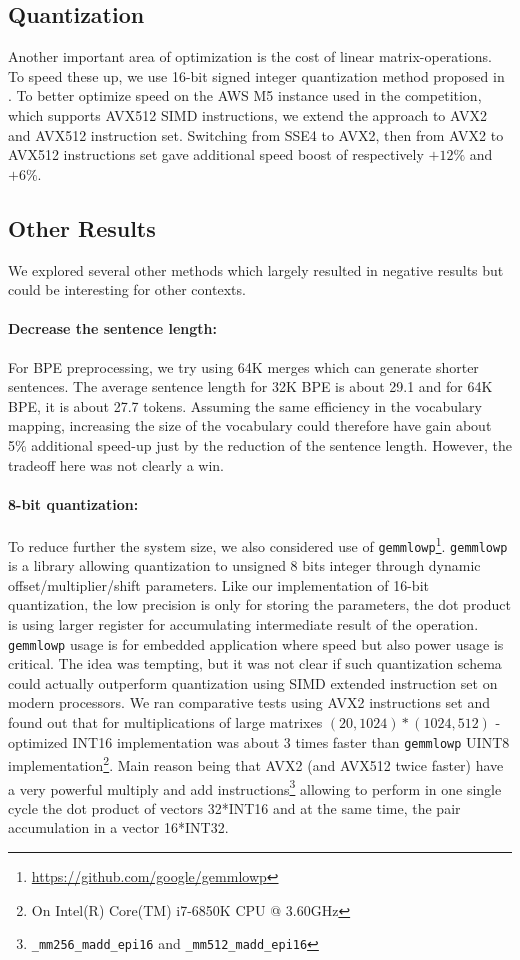 \documentclass[11pt,a4paper]{article}
\begin{document}
\subsection{Quantization}
\label{quantize}
Another important area of optimization is the cost of linear
matrix-operations.  To speed these up, we use 16-bit signed integer
quantization method proposed in .
To better optimize speed on the AWS M5 instance used in the
competition, which supports AVX512 SIMD instructions, we extend the
approach to AVX2 and AVX512 instruction set. Switching from SSE4 to AVX2, then from
AVX2 to AVX512 instructions set gave additional speed boost of
respectively $+12\%$ and $+6\%$.

\subsection{Other Results}
We explored several other methods which largely resulted in
negative results but could be interesting for other contexts.

\paragraph{Decrease the sentence length:}
For BPE preprocessing, we try using 64K merges which can generate shorter sentences.
The average sentence length for 32K BPE is about 29.1 and for 64K BPE, it is about 27.7 tokens. Assuming the same efficiency in the vocabulary mapping, increasing the size of the vocabulary could therefore have gain about 5\% additional speed-up just by the reduction of the sentence length. However, the tradeoff here was not clearly a win.

 \paragraph{8-bit quantization:}
To reduce further the system size, we also considered use of {\tt gemmlowp}\footnote{\url{https://github.com/google/gemmlowp}}. {\tt gemmlowp} is a library allowing quantization to unsigned 8 bits integer through dynamic offset/multiplier/shift parameters. Like our implementation of 16-bit quantization, the low precision is only for storing the parameters, the dot product is using larger register for accumulating intermediate result of the operation. {\tt gemmlowp} usage is for embedded application where speed but also power usage is critical. The idea was tempting, but it was not clear if such quantization schema could actually outperform quantization using SIMD extended instruction set on modern processors. We ran  comparative tests using AVX2 instructions set and found out that for multiplications of large matrixes $(20,1024) * (1024,512)$ - optimized INT16 implementation was about 3 times faster than  {\tt gemmlowp} UINT8 implementation\footnote{On Intel(R) Core(TM) i7-6850K CPU @ 3.60GHz}. Main reason being that AVX2 (and AVX512 twice faster) have a very powerful multiply and add instructions\footnote{{\tt \_mm256\_madd\_epi16} and {\tt \_mm512\_madd\_epi16}} allowing to perform in one single cycle the dot product of vectors 32*INT16 and at the same time, the pair accumulation in a vector 16*INT32.
\end{document}
